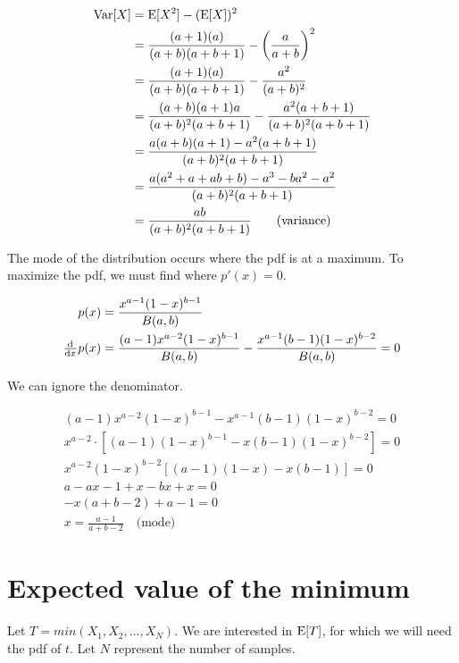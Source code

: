 \documentclass{article}
\begin{document}
\begin{align*}
  \mathrm{Var}[X] &= \mathrm{E}[X^2] - (\mathrm{E}[X])^2 \\
          &= \frac{(a+1)(a)}{(a+b)(a+b+1)} - \left(\frac{a}{a+b}\right)^2 \\
          &= \frac{(a+1)(a)}{(a+b)(a+b+1)} - \frac{a^2}{(a+b)^2} \\
          &= \frac{(a+b)(a+1)a}{(a+b)^2(a+b+1)} -
            \frac{a^2(a+b+1)}{(a+b)^2(a+b+1)} \\
          &= \frac{a(a+b)(a+1) - a^2(a+b+1)}{(a+b)^2(a+b+1)} \\
          &= \frac{a(a^2 + a + ab + b) - a^3 - ba^2 -
            a^2}{(a+b)^2(a+b+1)} \\
          &= \frac{ab}{(a+b)^2(a+b+1)} \qquad \text{(variance)}
\end{align*}

The mode of the distribution occurs where the pdf is at a maximum. To
maximize the pdf, we must find where $p'(x) = 0$.

\begin{align*}
  p(x) &= \frac{x^{a-1}(1-x)^{b-1}}{B(a,b)} \\
  \od{}{x} p(x) &= \frac{(a-1)x^{a-2}(1-x)^{b-1}}{B(a,b)} -
                 \frac{x^{a-1}(b-1)(1-x)^{b-2}}{B(a,b)} = 0 \\
\end{align*}

We can ignore the denominator.

\begin{gather*}
  (a-1)x^{a-2}(1-x)^{b-1} - x^{a-1}(b-1)(1-x)^{b-2} = 0 \\
  x^{a-2} \cdot \left[ (a-1)(1-x)^{b-1} - x(b-1)(1-x)^{b-2} \right] =
  0 \\
  x^{a-2}(1-x)^{b-2} \left[ (a-1)(1-x) - x(b-1) \right] = 0 \\
  a - ax - 1 + x - bx + x = 0 \\
  -x(a + b - 2) + a - 1 = 0 \\
  x = \frac{a-1}{a+b-2} \quad \text{(mode)}
\end{gather*}

\section{Expected value of the minimum}

Let $T = min(X_1,X_2,...,X_N)$. We are interested in $\mathrm{E}[T]$, for which we
will need the pdf of $t$. Let $N$ represent the number of samples.
\end{document}
